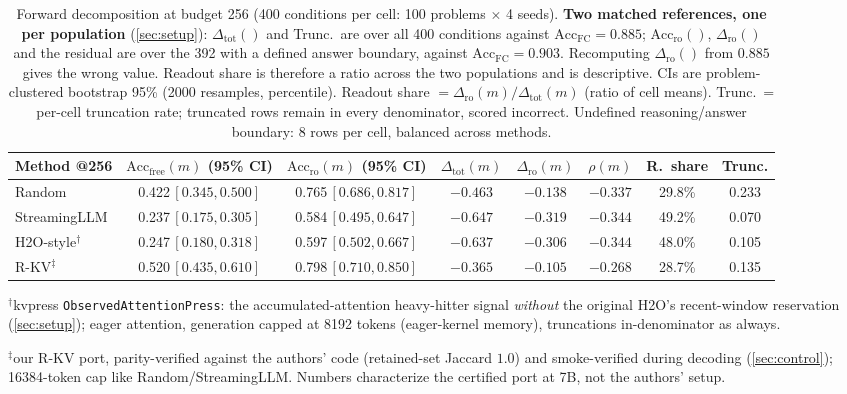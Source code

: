 \documentclass{article}
\newcommand{\accfc}{\mathrm{Acc}_{\mathrm{FC}}}
\newcommand{\accfree}[1]{\mathrm{Acc}_{\mathrm{free}}(#1)}
\newcommand{\accro}[1]{\mathrm{Acc}_{\mathrm{ro}}(#1)}
\newcommand{\dtot}[1]{\Delta_{\mathrm{tot}}(#1)}
\newcommand{\dro}[1]{\Delta_{\mathrm{ro}}(#1)}
\newcommand{\res}[1]{\rho(#1)}
\begin{document}
\begin{table}[t]
\centering
\caption{Forward decomposition at budget 256 (400 conditions per cell: 100 problems $\times$ 4 seeds). \textbf{Two matched references, one per population} (\cref{sec:setup}): $\dtot{}$ and Trunc.\ are over all 400 conditions against $\accfc = 0.885$; $\accro{}$, $\dro{}$ and the residual are over the 392 with a defined answer boundary, against $\accfc = 0.903$. Recomputing $\dro{}$ from $0.885$ gives the wrong value. Readout share is therefore a ratio across the two populations and is descriptive. CIs are problem-clustered bootstrap 95\% (2000 resamples, percentile). Readout share $= \dro{m}/\dtot{m}$ (ratio of cell means). Trunc.\ = per-cell truncation rate; truncated rows remain in every denominator, scored incorrect. Undefined reasoning/answer boundary: 8 rows per cell, balanced across methods.}
\label{tab:decomp}
\footnotesize
\setlength{\tabcolsep}{2.5pt}
\begin{tabular}{lccccccc}
\toprule
Method @256 & $\accfree{m}$ (95\% CI) & $\accro{m}$ (95\% CI) & $\dtot{m}$ & $\dro{m}$ & $\res{m}$ & R.\ share & Trunc. \\
\midrule
Random       & 0.422\,$[0.345,0.500]$ & 0.765\,$[0.686,0.817]$ & $-0.463$ & $-0.138$ & $\mathbf{-0.337}$ & 29.8\% & 0.233 \\
StreamingLLM & 0.237\,$[0.175,0.305]$ & 0.584\,$[0.495,0.647]$ & $-0.647$ & $-0.319$ & $\mathbf{-0.344}$ & 49.2\% & 0.070 \\
H2O-style$^{\dagger}$ & 0.247\,$[0.180,0.318]$ & 0.597\,$[0.502,0.667]$ & $-0.637$ & $-0.306$ & $\mathbf{-0.344}$ & 48.0\% & 0.105 \\
R-KV$^{\ddagger}$ & 0.520\,$[0.435,0.610]$ & 0.798\,$[0.710,0.850]$ & $-0.365$ & $-0.105$ & $\mathbf{-0.268}$ & 28.7\% & 0.135 \\
\bottomrule
\end{tabular}

\smallskip
{\footnotesize $^{\dagger}$kvpress \texttt{ObservedAttentionPress}: the accumulated-attention heavy-hitter signal \emph{without} the original H2O's recent-window reservation (\cref{sec:setup}); eager attention, generation capped at 8192 tokens (eager-kernel memory), truncations in-denominator as always.}

{\footnotesize $^{\ddagger}$our R-KV port, parity-verified against the authors' code (retained-set Jaccard $1.0$) and smoke-verified during decoding (\cref{sec:control}); 16384-token cap like Random/StreamingLLM. Numbers characterize the certified port at 7B, not the authors' setup.}
\end{table}
\end{document}
